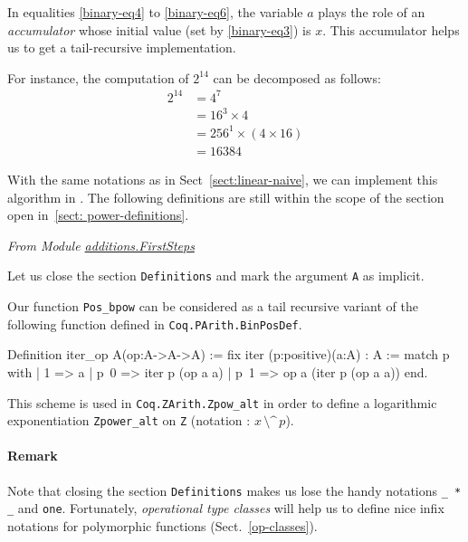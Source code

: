 In equalities \ref{binary-eq4} to \ref{binary-eq6}, the variable $a$ plays the role
of an \emph{accumulator} whose initial value (set by \ref{binary-eq3}) is $x$.
This accumulator helps us to get a tail-recursive implementation.

For instance, the computation of $2^{14}$ can be decomposed as follows:
\begin{align*}
2^{14} &= 4^{7} \\
      &= 16^3 \times 4 \\
      &= 256^1 \times (4 \times 16) \\
      &= 16384  
\end{align*}

With the same notations as in Sect~\vref{sect:linear-naive}, we can implement this algorithm in \gallina. The following definitions are still within the scope of the 
section open in~\vref{sect: power-definitions}.



\label{polymorhic-binary_exp}


\vspace{4pt}

\emph{From Module
\href{../theories/html/additions.FirstSteps.html}{additions.FirstSteps}}

Let us  close the section \texttt{Definitions} and mark the argument \texttt{A} as implicit.

\begin{remark}
Our function \texttt{Pos\_bpow} can be considered as a tail recursive variant
of the following function defined in \texttt{Coq.PArith.BinPosDef}.



\begin{Coqsrc}
Definition iter_op {A}(op:A->A->A) :=
  fix iter (p:positive)(a:A) : A :=
  match p with
    | 1 => a
    | p~0 => iter p (op a a)
    | p~1 => op a (iter p (op a a))
  end.
\end{Coqsrc}

This scheme is used in \texttt{Coq.ZArith.Zpow\_alt} in order to define a logarithmic exponentiation \texttt{Zpower\_alt} on \texttt{Z} (notation : $x\,\texttt{\^{}\^{}}\,p$).

\end{remark}

\paragraph*{Remark}
Note that closing the section \texttt{Definitions} makes us lose the
handy notations \texttt{\_ * \_} and \texttt{one}. Fortunately, \emph{operational type classes} will help us to define nice infix notations for polymorphic functions (Sect.~\vref{op-classes}).

